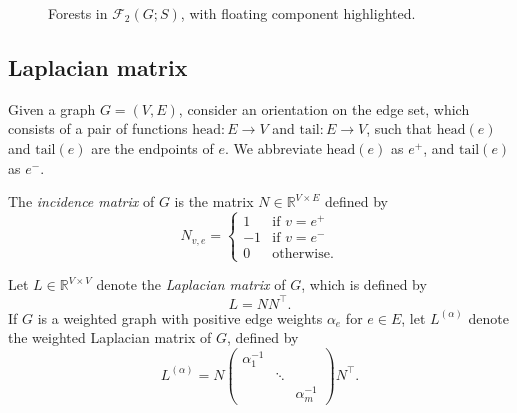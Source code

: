 \documentclass{amsart}
\theoremstyle{definition}
\newcommand{\RR}{\mathbb{R}}
\newcommand{\La}{L^{(\alpha)}}
\newcommand{\tr}{\intercal}
\newcommand{\forests}{\mathcal{F}}
\begin{document}
\begin{figure}[h]
%	
%
%
\caption{Forests in $\forests_2(G;S)$, with floating component highlighted.}
\label{fig:2-forests}
\end{figure}


\subsection{Laplacian matrix}

Given a graph $G = (V,E)$, consider an orientation on the edge set, which consists of a pair of functions $\mathrm{head}: E \to V$ and $\mathrm{tail}: E \to V$, such that $\mathrm{head}(e)$ and $\mathrm{tail}(e)$ are the endpoints of $e$.
We abbreviate $\mathrm{head}(e)$ as $e^+$, and $\mathrm{tail}(e)$ as $e^-$.

The {\em incidence matrix} of $G$ is the matrix $N \in \RR^{V \times E}$ defined by
\[
	N_{v, e} = \begin{cases}
	1 &\text{if } v = e^+ \\
	-1 &\text{if } v = e^- \\
	0 &\text{otherwise}.
	\end{cases}
\]

Let $L \in \RR^{V \times V}$ denote the {\em Laplacian matrix} of $G$, which is defined by
\[
	L = N N^\tr.
\]
If $G$ is a weighted graph with positive edge weights $\alpha_e$ for $e \in E$,
let $\La$ denote the weighted Laplacian matrix of $G$,
defined by
\begin{equation}
\label{eq:weighted-laplacian}
	\La = N \begin{pmatrix}
	\alpha_1^{-1} & & \\
	& \ddots & \\
	& & \alpha_m^{-1}
	\end{pmatrix} N^\tr .
\end{equation}
\end{document}
